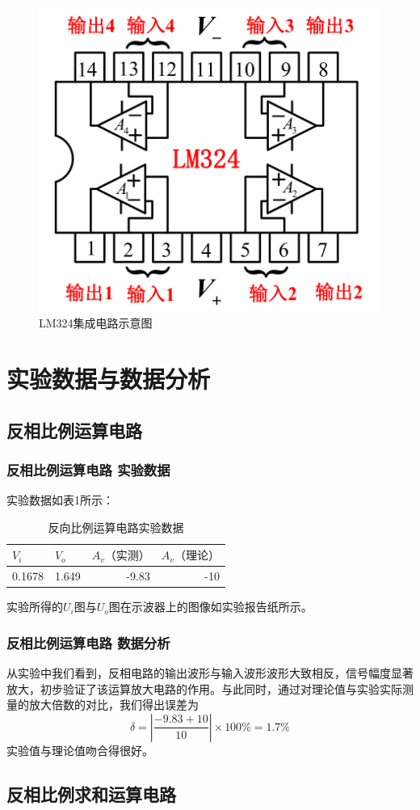 \documentclass[UTF8]{article}
\begin{document}
\begin{figure}[htbp]
    \centering
    \includegraphics[width=0.3\linewidth]{sbbb7}
    \caption{LM324集成电路示意图}
    
\end{figure}

\section{实验数据与数据分析}
\subsection{反相比例运算电路}
\subsubsection{反相比例运算电路 实验数据}
实验数据如表1所示：
\begin{table}[htbp]
	\centering
	\caption{反向比例运算电路实验数据}
	\begin{tabular}{|r|r|r|r|}
		\toprule
		\multicolumn{1}{|l|}{$V_i$} & \multicolumn{1}{l|}{$V_o$} & \multicolumn{1}{l|}{$A_v（实测）$} & \multicolumn{1}{l|}{$A_v（理论）$} \\
		\midrule
		0.1678 & 1.649 & -9.83 & -10 \\
		\bottomrule
	\end{tabular}%
	\label{tab1}%
\end{table}%
实验所得的$U_i$图与$U_o$图在示波器上的图像如实验报告纸所示。

\subsubsection{反相比例运算电路 数据分析}
从实验中我们看到，反相电路的输出波形与输入波形波形大致相反，信号幅度显著放大，初步验证了该运算放大电路的作用。与此同时，通过对理论值与实验实际测量的放大倍数的对比，我们得出误差为
$$\delta = |\frac{-9.83+10}{10}|\times 100\% = 1.7\% $$
实验值与理论值吻合得很好。
	
	
\subsection{反相比例求和运算电路}
\end{document}
